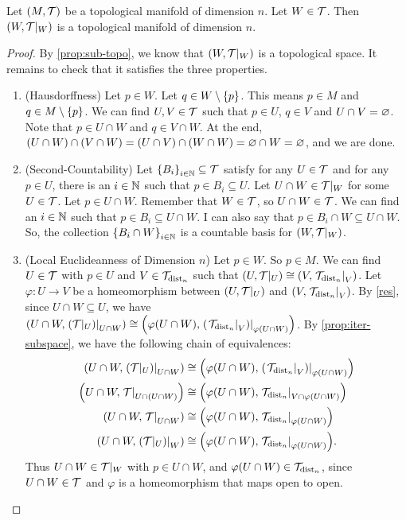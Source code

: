 \documentclass[11pt,reqno]{amsart}
\renewcommand{\phi}{\varphi}
\begin{document}
\begin{Prop}\label{prop:open-sub-manifold}
Let $(M,\mathcal{T})$ be a topological manifold of dimension $n$.
Let $W\in\mathcal{T}$.
Then $(W,\mathcal{T}|_W)$ is a topological manifold of dimension $n$.
\end{Prop}
\begin{proof}
By \ref{prop:sub-topo}, we know that $(W,\mathcal{T}|_W)$ is a topological space.
It remains to check that it satisfies the three properties.
\begin{enumerate}

\item (Hausdorffness)
Let $p\in W$. Let $q\in W\setminus\set{p}$.
This means $p\in M$ and $q\in M\setminus\set{p}$.
We can find $U,V\in\mathcal{T}$ such that $p\in U$, $q\in V$ and $U\cap V=\varnothing$.
Note that $p\in U\cap W$ and $q\in V\cap W$. At the end,
$(U\cap W)\cap(V\cap W)=(U\cap V)\cap(W\cap W)=\varnothing\cap W=\varnothing$, and we are done.

\item (Second-Countability)
Let $\set{B_i}_{i\in\N}\subseteq\T$ satisfy for any $U\in\mathcal{T}$ and for any
$p\in U$, there is an $i\in\mathbb{N}$ such that $p\in B_i\subseteq U$.
Let $U\cap W\in\mathcal{T}|_W$ for some $U\in\mathcal{T}$. Let $p\in U\cap W$.
Remember that $W\in\mathcal{T}$, so $U\cap W\in\mathcal{T}$.
We can find an $i\in\mathbb{N}$ such that $p\in B_i\subseteq U\cap W$.
I can also say that $p\in B_i\cap W\subseteq U\cap W$.
So, the collection $\set{B_i\cap W}_{i\in\N}$ is a countable basis for $(W,\mathcal{T}|_W)$.

\item (Local Euclideanness of Dimension $n$)
Let $p\in W$. So $p\in M$.
We can find $U\in\mathcal{T}$ with $p\in U$ and $V\in\mathcal{T}_{\mathrm{dist}_n}$ such that
$(U,\T|_U)\cong\Br{V,\eval{\T_{\dist_n}}_V}$.
Let $\phi:U\to V$ be a homeomorphism between $(U,\mathcal{T}|_U)$ and
$\Br{V,\eval{\T_{\dist_n}}_V}$.
By \ref{res}, since $U\cap W\subseteq U$, we have
$\Br{U\cap W,\eval{\Br{\T|_U}}_{U\cap W}}\cong
\Br{\phi(U\cap W),\eval{\Br{\eval{\T_{\dist_n}}_V}}_{\phi(U\cap W)}}$.
By \ref{prop:iter-subspace}, we have the following chain of equivalences:
\[\begin{aligned}
\Br{U\cap W,\eval{\Br{\T|_U}}_{U\cap W}}
&\cong\Br{\phi(U\cap W),\eval{\Br{\eval{\T_{\dist_n}}_V}}_{\phi(U\cap W)}}\\
\Br{U\cap W,\eval{\T}_{U\cap(U\cap W)}}
&\cong\Br{\phi(U\cap W),\eval{\T_{\dist_n}}_{V\cap\phi(U\cap W)}}\\
\Br{U\cap W,\eval{\T}_{U\cap W}}
&\cong\Br{\phi(U\cap W),\eval{\T_{\dist_n}}_{\phi(U\cap W)}}\\
\Br{U\cap W,\eval{\Br{\T|_U}}_W}
&\cong\Br{\phi(U\cap W),\eval{\T_{\dist_n}}_{\phi(U\cap W)}}.
\end{aligned}\]
Thus $U\cap W\in\mathcal{T}|_W$ with $p\in U\cap W$, and
$\phi(U\cap W)\in\T_{\dist_n}$, since $U\cap W\in\mathcal{T}$ and $\phi$ is
a homeomorphism that maps open to open.
\end{enumerate}
\end{proof}
\end{document}
